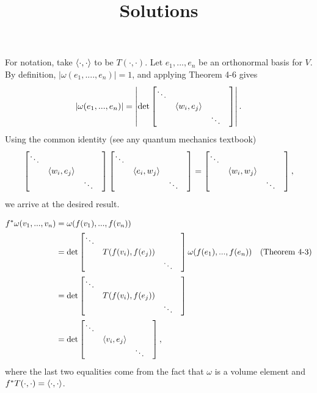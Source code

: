 \documentclass[11pt]{scrartcl}
\begin{document}
\title{Solutions}

\maketitle

\begin{problem*}[4-3]
\end{problem*}

For notation, take $\langle \cdot, \cdot \rangle$ to be $T(\cdot, \cdot)$.
Let $e_1, ..., e_n$ be an orthonormal basis for $V$.
By definition, $|\omega(e_1, ...., e_n)| = 1$, and applying Theorem 4-6 gives 
$$|\omega(e_1, ..., e_n)| = \left|\det\begin{bmatrix} \ddots & & & \\ & \langle w_i, e_j \rangle & & \\ & & \ddots \end{bmatrix}\right|.$$
Using the common identity (see any quantum mechanics textbook)
$$\begin{bmatrix} \ddots & & & \\ & \langle w_i, e_j \rangle & & \\ & & \ddots \end{bmatrix}\begin{bmatrix} \ddots & & & \\ & \langle e_i, w_j \rangle & & \\ & & \ddots \end{bmatrix} = \begin{bmatrix} \ddots & & & \\ & \langle w_i, w_j \rangle & & \\ & & \ddots \end{bmatrix},$$ 
we arrive at the desired result.

\begin{problem*}[4-4]
\end{problem*}

\begin{align*}
    f^*\omega(v_1, ..., v_n) 
    &= 
    \omega(f(v_1), ..., f(v_n)) \\
    &=
    \det\begin{bmatrix} \ddots & & & \\ & T(f(v_i), f(e_j)) & & \\ & & \ddots \end{bmatrix}\omega(f(e_1), ..., f(e_n)) &\text{(Theorem 4-3)} \\
    &=
    \det\begin{bmatrix} \ddots & & & \\ & T(f(v_i), f(e_j)) & & \\ & & \ddots \end{bmatrix}\\
    &= 
    \det\begin{bmatrix} \ddots & & & \\ & \langle v_i, e_j \rangle & & \\ & & \ddots \end{bmatrix},
\end{align*}
where the last two equalities come from the fact that $\omega$ is a volume element and $f^*T(\cdot, \cdot) = \langle \cdot, \cdot \rangle$.
\end{document}
